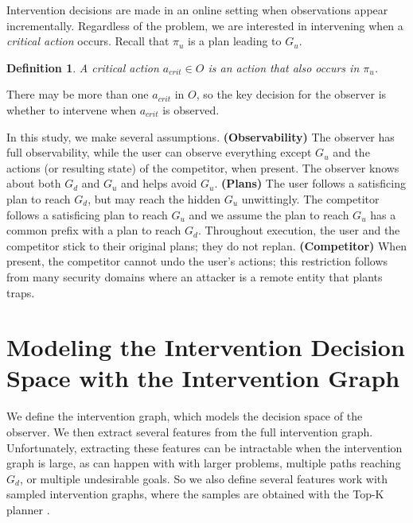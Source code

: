 \documentclass[letterpaper]{article}
\theoremstyle{plain}
\newtheorem{definition}{Definition}
\begin{document}


Intervention decisions are made in an online setting when observations appear incrementally.
Regardless of the problem, we are interested in intervening when a \emph{critical action} occurs.
Recall that $\pi_u$ is a plan leading to $G_u$.
\begin{definition}
A \textnormal{critical action} $a_{crit} \in O$ is an action that also occurs in $\pi_u$.
\end{definition}
\noindent There may be more than one $a_{crit}$ in $O$, so the key decision for the observer is whether to intervene when $a_{crit}$ is observed.

In this study, we make several assumptions.
\textbf{(Observability)} 
The observer has full observability, while the user can observe everything except $G_u$ and the actions (or resulting state) of the competitor, when present.
The observer knows about both $G_d$ and $G_u$ and helps avoid $G_u$.
\textbf{(Plans)} 
The user follows a satisficing plan to reach $G_d$, but may reach the hidden $G_u$ unwittingly. 
The competitor follows a satisficing plan to reach $G_u$ and we assume the plan to reach $G_u$ has a common prefix with a plan to reach $G_d$. 
Throughout execution, the user and the competitor stick to their original plans; they do not replan.
\textbf{(Competitor)}
When present, the competitor cannot undo the user's actions; this restriction follows from many security domains where an attacker is a remote entity that plants traps.




\section{Modeling the Intervention Decision Space with the Intervention Graph}
\label{sec:stategraph}
We define the intervention graph, which models the decision space of the observer.
We then extract several features from the full intervention graph.
Unfortunately, extracting these features can be intractable when the intervention graph is large, as can happen with with larger problems, multiple paths reaching $G_d$, or multiple undesirable goals. So we also define several features work with sampled intervention graphs, where the samples are obtained with the Top-K planner \cite{riabov2014}.
\end{document}
